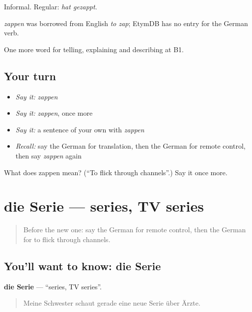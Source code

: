Informal. Regular: \emph{hat gezappt}.

\begin{cousinweb}
\emph{zappen} was borrowed from English \emph{to zap}; EtymDB has no entry for the German verb.
\end{cousinweb}

\begin{grammarlens}[title={What you've built}]
One more word for telling, explaining and describing at B1.
\end{grammarlens}

\subsection*{Your turn}
\begin{itemize}
\raggedright
  \item \emph{Say it:} \emph{zappen}
  \item \emph{Say it:} \emph{zappen}, once more
  \item \emph{Say it:} a sentence of your own with \emph{zappen}
  \item \emph{Recall:} say the German for translation, then the German for remote control, then say \emph{zappen} again
\end{itemize}

\begin{tcolorbox}[breakable,colback=teal!4,colframe=teal!35!black,title={Before you move on}]
What does zappen mean? (\textquotedblleft{}To flick through channels\textquotedblright{}.) Say it once more.
\end{tcolorbox}
\section[die Serie]{die Serie — series, TV series}

\label{lesson:GE-C523-serie}



\begin{quote}
Before the new one: say the German for remote control, then the German for to flick through channels.
\end{quote}

\subsection*{You'll want to know: die Serie}
\textbf{die Serie} — \textquotedblleft{}series, TV series\textquotedblright{}.

\begin{quote}
Meine Schwester schaut gerade eine neue Serie über Ärzte.
\end{quote}

